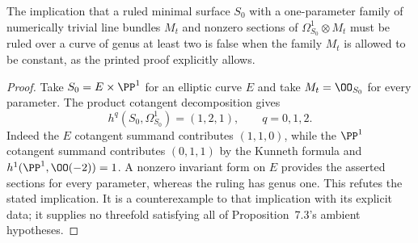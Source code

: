 
\begin{proposition}\label{cdp:st:A.4.2}
The implication that a ruled minimal surface $S_0$ with a one-parameter family of numerically trivial line bundles $M_t$ and nonzero sections of $\Omega^1_{S_0}\otimes M_t$ must be ruled over a curve of genus at least two is false when the family $M_t$ is allowed to be constant, as the printed proof explicitly allows.
\end{proposition}
\begin{proof}
Take $S_0=E\times\PP^1$ for an elliptic curve $E$ and take $M_t=\OO_{S_0}$ for every parameter. The product cotangent decomposition gives
\[
 h^q(S_0,\Omega^1_{S_0})=(1,2,1),\qquad q=0,1,2.
\]
Indeed the $E$ cotangent summand contributes $(1,1,0)$, while the $\PP^1$ cotangent summand contributes $(0,1,1)$ by the Kunneth formula and $h^1(\PP^1,\OO(-2))=1$. A nonzero invariant form on $E$ provides the asserted sections for every parameter, whereas the ruling has genus one. This refutes the stated implication. It is a counterexample to that implication with its explicit data; it supplies no threefold satisfying all of Proposition~7.3's ambient hypotheses.
\end{proof}


